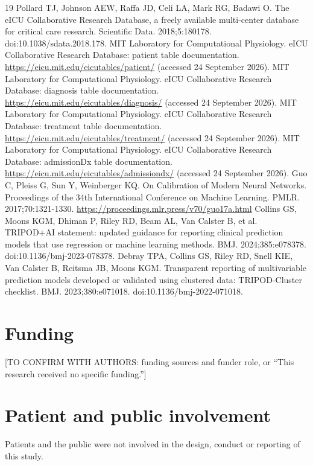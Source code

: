 \documentclass[11pt]{article}
\begin{document}
\begin{thebibliography}{19}
 Pollard TJ, Johnson AEW, Raffa JD, Celi LA, Mark RG, Badawi O. The eICU Collaborative Research Database, a freely available multi-center database for critical care research. Scientific Data. 2018;5:180178. doi:10.1038/sdata.2018.178.
 MIT Laboratory for Computational Physiology. eICU Collaborative Research Database: patient table documentation. \url{https://eicu.mit.edu/eicutables/patient/} (accessed 24 September 2026).
 MIT Laboratory for Computational Physiology. eICU Collaborative Research Database: diagnosis table documentation. \url{https://eicu.mit.edu/eicutables/diagnosis/} (accessed 24 September 2026).
 MIT Laboratory for Computational Physiology. eICU Collaborative Research Database: treatment table documentation. \url{https://eicu.mit.edu/eicutables/treatment/} (accessed 24 September 2026).
 MIT Laboratory for Computational Physiology. eICU Collaborative Research Database: admissionDx table documentation. \url{https://eicu.mit.edu/eicutables/admissiondx/} (accessed 24 September 2026).
 Guo C, Pleiss G, Sun Y, Weinberger KQ. On Calibration of Modern Neural Networks. Proceedings of the 34th International Conference on Machine Learning. PMLR. 2017;70:1321-1330. \url{https://proceedings.mlr.press/v70/guo17a.html}
 Collins GS, Moons KGM, Dhiman P, Riley RD, Beam AL, Van Calster B, et al. TRIPOD+AI statement: updated guidance for reporting clinical prediction models that use regression or machine learning methods. BMJ. 2024;385:e078378. doi:10.1136/bmj-2023-078378.
 Debray TPA, Collins GS, Riley RD, Snell KIE, Van Calster B, Reitsma JB, Moons KGM. Transparent reporting of multivariable prediction models developed or validated using clustered data: TRIPOD-Cluster checklist. BMJ. 2023;380:e071018. doi:10.1136/bmj-2022-071018.
\end{thebibliography}

\section*{Funding}
[TO CONFIRM WITH AUTHORS: funding sources and funder role, or ``This research received no specific funding.'']

\section*{Patient and public involvement}
Patients and the public were not involved in the design, conduct or reporting of this study.
\end{document}
